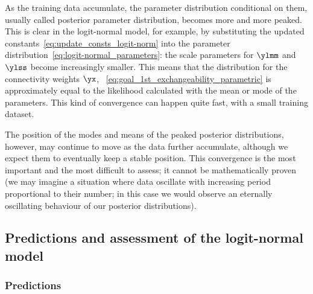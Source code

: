 As the training data accumulate, the parameter distribution conditional on them,
usually called posterior parameter distribution, becomes more and more peaked.
This is clear in the logit-normal model, for example, by substituting the
updated constants~\eqref{eq:update_consts_logit-norm} into the parameter
distribution~\eqref{eq:logit-normal_parameters}: the scale parameters for
$\ylmm$ and $\ylss$ become increasingly smaller. This means that the
distribution for the connectivity weights $\yx$,
\eqn~\eqref{eq:goal_1st_exchangeability_parametric} is approximately equal
to the likelihood calculated with the mean or mode of the parameters. This
kind of convergence can happen quite fast, with a small training dataset.

The position of the modes and means of the peaked posterior distributions,
however, may continue to move as the data further accumulate, although we
expect them to eventually keep a stable position. This convergence is the
most important and the most difficult to assess; it cannot be
mathematically proven (we may imagine a situation where data oscillate with
increasing period proportional to their number; in this case we would
observe an eternally oscillating behaviour of our posterior distributions).


\subsection{Predictions and assessment of the logit-normal model}
\label{sec:assessment_logit-normal}

\subsubsection{Predictions}

